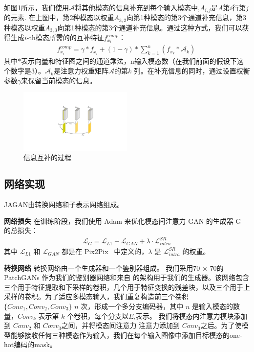 如图\ref{fig:Complementary}所示，我们使用$\mathcal{A}$将其他模态的信息补充到每个输入模态中,$A_{i,j}$是$A$第$i$行第$j$的元素. 在上图中，第2种模态以权重$A_{3,2}$向第1种模态的第3个通道补充信息，第3种模态以权重$A_{3,3}$向第1种模态的第3个通道补充信息。通过这种方式，我们可以获得生成$i$-th模态所需的的互补特征$f_{x_i}^{comp}$：
\begin{gather}
	f_{x_i}^{comp} = \gamma * f_{x_i} +
	(1-\gamma) * \sum_{k=1}^n (f_{x_k} * \mathcal{A}_{k})\
\end{gather}
其中$*$表示向量和特征图之间的通道乘法，n输入模态数（在我们前面的假设下这个数字是3）。$\mathcal{A}_{k}$是注意力权重矩阵$\mathcal{A}$的第$k$ 列。在补充信息的同时，通过设置权衡参数$\gamma$来保留当前模态的信息。

\begin{figure}
	\centering
	\includegraphics[width=0.5\textwidth]{figures/JAGAN/20201109InterAttention_function_BV1_0.pdf}
	\caption[aaa]{信息互补的过程} 
	\label{fig:Complementary}
\end{figure}

\subsection{网络实现}

JAGAN由转换网络和子表示网络组成。

\textbf{网络损失} 在训练阶段，我们使用 Adam 来优化模态间注意力-GAN 的生成器 G 的总损失：
\begin{align}
	\mathcal{L}_G = \mathcal{L}_{L1} + \mathcal{L}_{GAN} + \lambda  \cdot \mathcal{L}_{intra}^{SR}
\end{align}
其中 $\mathcal{L}_{L1}$ 和 $\mathcal{L}_{GAN}$ 都是在 Pix2Pix~\cite{pix2pix} 中定义的，$\lambda$ 是 $\mathcal{L}_{intra}^{SR}$ 的权重。

\textbf{转换网络} 转换网络由一个生成器和一个鉴别器组成。 我们采用70 × 70的PatchGANs\cite{pix2pix} 作为我们的鉴别器网络和来自 \cite{perceptual} 的架构用于我们的生成器。该网络包含三个用于特征提取和下采样的卷积，几个用于特征变换的残差块，以及三个用于上采样的卷积。为了适应多模态输入，我们重复构造前三个卷积 $\{Conv_1, Conv_2, Conv_3\}$ $n$ 次，形成一个多分支编码器，其中 $n$ 是输入模态的数量，$ Conv_k$ 表示第 $k$ 个卷积，每个分支以$E_i$表示。 我们将模态内注意力模块添加到 $Conv_2$ 和 $Conv_3$之间，并将模态间注意力 注意力添加到 $Conv_3$之后。为了使模型能够接收任何三种模态作为输入，我们在每个输入图像中添加目标模态的one-hot编码的mask\cite{stargan}\cite{collagan}。

